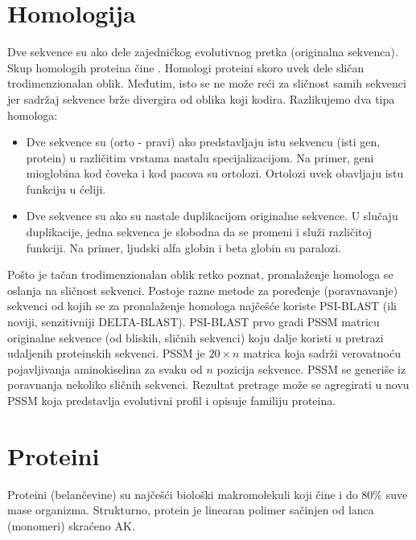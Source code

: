 \section{Homologija}

Dve sekvence su  ako dele zajedničkog evolutivnog pretka
(originalna sekvenca). Skup homologih proteina čine . Homologi proteini skoro uvek dele sličan trodimenzionalan oblik.
Međutim, isto se ne može reći za sličnost samih sekvenci jer sadržaj sekvence
brže divergira od oblika koji kodira. Razlikujemo dva tipa homologa:
\begin{itemize}
  \item
    Dve sekvence su  (orto - pravi) ako predstavljaju istu
    sekvencu (isti gen, protein) u različitim vrstama nastalu specijalizacijom.
    Na primer, geni mioglobina kod čoveka i kod pacova su ortolozi. Ortolozi
    uvek obavljaju istu funkciju u ćeliji.

  \item Dve sekvence su  ako su nastale duplikacijom
    originalne sekvence. U slučaju duplikacije, jedna sekvenca je slobodna
    da se promeni i služi različitoj funkciji. Na primer, ljudski
    alfa globin i beta globin su paralozi.
\end{itemize}

Pošto je tačan trodimenzionalan oblik retko poznat, pronalaženje homologa
se oslanja na sličnost sekvenci. Postoje razne metode za poređenje
(poravnavanje) sekvenci od kojih se za pronalaženje homologa najčešće koriste
PSI-BLAST (ili noviji, senzitivniji DELTA-BLAST).  PSI-BLAST  prvo gradi PSSM matricu
originalne sekvence (od bliskih, sličnih sekvenci) koju dalje koristi u pretrazi
udaljenih proteinskih sekvenci. PSSM  je
$20 \times n$ matrica koja sadrži verovatnoću pojavljivanja aminokiselina
za svaku od $n$ pozicija sekvence. PSSM se generiše iz poravnanja nekoliko
sličnih sekvenci. Rezultat pretrage može se agregirati u novu PSSM koja
predstavlja evolutivni profil i opisuje familiju proteina. 

\label{sec:}
\section{Proteini}

Proteini (belančevine) su najčešći biološki makromolekuli koji čine i do $80\%$
suve mase organizma.  Strukturno, protein je linearan polimer sačinjen od lanca
 (monomeri) skraćeno AK.

